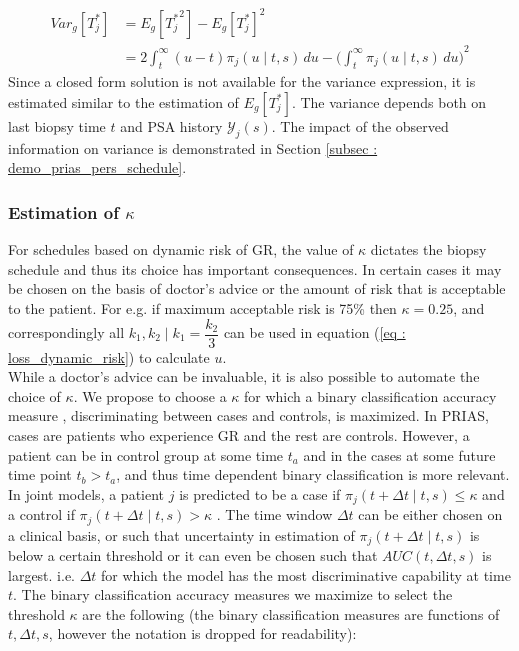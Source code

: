 \begin{equation}
\begin{split}
Var_g[T^*_j] &= E_g[{T^*_j}^2] - {E_g[T^*_j]}^2\\
&= 2 \int_t^\infty {(u-t) \pi_j(u \mid t, s) \,du} - {\bigg(\int_t^\infty \pi_j(u \mid t, s) \,du\bigg)}^2
\end{split}
\end{equation}
Since a closed form solution is not available for the variance expression, it is estimated similar to the estimation of $E_g[T^*_j]$. The variance depends both on last biopsy time $t$ and PSA history $\mathcal{Y}_j(s)$. The impact of the observed information on variance is demonstrated in Section \ref{subsec : demo_prias_pers_schedule}.

\subsubsection{Estimation of $\kappa$}
For schedules based on dynamic risk of GR, the value of $\kappa$ dictates the biopsy schedule and thus its choice has important consequences. In certain cases it may be chosen on the basis of doctor's advice or the amount of risk that is acceptable to the patient. For e.g. if maximum acceptable risk is 75\% then $\kappa = 0.25$, and correspondingly all $k_1, k_2 \mid k_1=\dfrac{k_2}{3}$ can be used in equation (\ref{eq : loss_dynamic_risk}) to calculate $u$.\\

While a doctor's advice can be invaluable, it is also possible to automate the choice of $\kappa$. We propose to choose a $\kappa$ for which a binary classification accuracy measure \citep{lopez2014optimalcutpoints,sokolova2009systematic}, discriminating between cases and controls, is maximized. In PRIAS, cases are patients who experience GR and the rest are controls. However, a patient can be in control group at some time $t_a$ and in the cases at some future time point $t_b > t_a$, and thus time dependent binary classification is more relevant. In joint models, a patient $j$ is predicted to be a case if $\pi_j(t + \Delta t \mid t,s) \leq \kappa$ and a control if $\pi_j(t + \Delta t \mid t,s) > \kappa$ \citep{rizopoulosJMbayes}. The time window $\Delta t$ can be either chosen on a clinical basis, or such that uncertainty in estimation of $\pi_j(t + \Delta t \mid t,s)$ is below a certain threshold or it can even be chosen such that $AUC(t, \Delta t, s)$ \citep{rizopoulosJMbayes} is largest. i.e. $\Delta t$ for which the model has the most discriminative capability at time $t$. The binary classification accuracy measures we maximize to select the threshold $\kappa$ are the following (the binary classification measures are functions of $t, \Delta t, s$, however the notation is dropped for readability): 

